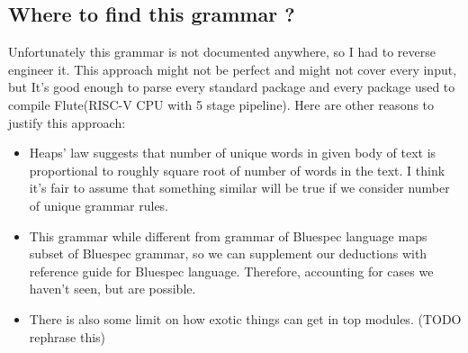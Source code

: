 \documentclass[12pt]{report}
\begin{document}
\subsection{Where to find this grammar ?}
Unfortunately this grammar is not documented anywhere, so I had to reverse engineer it. This approach might not be perfect and might not cover every input, but It's good enough to parse every standard package and every package used to compile Flute(RISC-V CPU with 5 stage pipeline).
Here are other reasons to justify this approach:
\begin{itemize}
    \item Heaps' law suggests that number of unique words in given body of text is proportional to roughly square root of number of words in the text. I think it's fair to assume that something similar will be true if we consider number of unique grammar rules.
    \item This grammar while different from grammar of Bluespec language maps subset of Bluespec grammar, so we can supplement our deductions with reference guide for Bluespec language. Therefore, accounting for cases we haven't seen, but are possible.
    \item There is also some limit on how exotic things can get in top modules. (TODO rephrase this)
\end{itemize}
\end{document}
